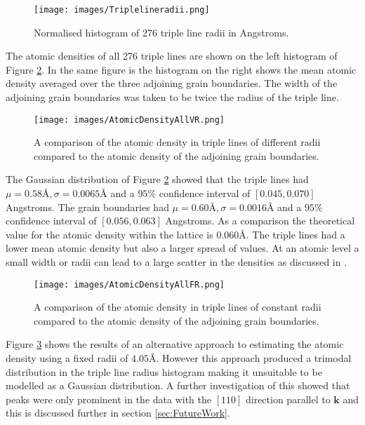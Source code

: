 \documentclass[12pt,a4paper,openany]{report}
\begin{document}
\begin{figure}[H]
	\texttt{[image: images/Triplelineradii.png]}  
	\caption{Normalised histogram of 276 triple line radii in Angstroms.}	
	\label{fig:TJRadii}
\end{figure}	

The atomic densities of all 276 triple lines are shown on the left histogram of  Figure \ref{fig:AtomicDensityVR}. In the same figure is the histogram on the right shows the mean atomic density averaged over the three adjoining grain boundaries. The width of the adjoining grain boundaries was taken to be twice the radius of the triple line. 

\begin{figure}[H]
	\centering
	\texttt{[image: images/AtomicDensityAllVR.png]} 
	\caption{A comparison of the atomic density in triple lines of different radii compared to the atomic density of the adjoining grain boundaries.}
	\label{fig:AtomicDensityVR}
\end{figure}

The Gaussian distribution of Figure \ref{fig:AtomicDensityVR}  showed that the triple lines had $\mu = 0.58 \textrm{\AA}, \sigma = 0.0065 \textrm{\AA} $ and a $95\%$ confidence interval of $[0.045, 0.070]$ Angstroms. The grain boundaries had $\mu = 0.60 \textrm{\AA}, \sigma = 0.0016 \textrm{\AA} $ and a $95\%$ confidence interval of $[0.056, 0.063]$ Angstroms. As a comparison the theoretical value for the atomic density within the lattice is
$0.060 \textrm{\AA}$. The triple lines had a lower mean atomic density but also a larger spread of values. At an atomic level a small width or radii can lead to a large scatter in the densities as discussed in \cite{Kamachali2019}.  
 



\begin{figure}[H]
	\centering
	\texttt{[image: images/AtomicDensityAllFR.png]} 	
	\caption{A comparison of the atomic density in triple lines of constant radii  compared to the atomic density of the adjoining grain boundaries.}
	\label{fig:AtomicDensityFR}
\end{figure}

Figure \ref{fig:AtomicDensityFR} shows the results of an alternative approach to estimating the atomic density using a fixed radii of $4.05 \textrm{\AA}$. However this approach produced a trimodal distribution in the triple line radius histogram making it unsuitable to be modelled as a Gaussian distribution. A further investigation of this showed that peaks were only prominent in the data with the $[110]$ direction parallel to $\mathbf{k}$ and this is discussed further in section \ref{sec:FutureWork}. 
\end{document}
